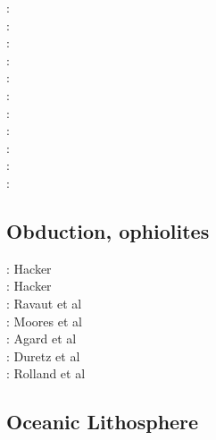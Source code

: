 \begin{scriptsize}
\nineteeneightyfour: \cite{olyb84}\\
\nineteenninety: \cite{ketu90}\\
\nineteenninetysix: \cite{pelt96}\\
\nineteenninetynine: \cite{cori99}\\
\twothousandone: \cite{huke01}\\
\twothousandtwo: \cite{vahb02}\\
\twothousandthree: \cite{fasa03}\cite{vabh03}\\
\twothousandfive: \cite{colt05}\\
\twothousandseven: \cite{gogc07}\cite{nake07}\cite{vabh07}\\
\twothousandeleven: \cite{lemj11}\cite{saad11}\\
\twothousandeighteen: \cite{onzh18}
\end{scriptsize}

\subsection{Obduction, ophiolites}
 

\begin{scriptsize}
\nineteenninety: Hacker \cite{hack90}\\
\nineteenninetyone: Hacker \cite{hack91}\\
\nineteenninetyseven: Ravaut et al \cite{rabh97}\\
\twothousand: Moores et al \cite{mokd00}\\
\twothousandfourteen: Agard et al \cite{agzf14}\\
\twothousandsixteen: Duretz et al \cite{duay16}\\
\twothousandtwenty: Rolland et al \cite{rohb20}
\end{scriptsize}

\subsection{Oceanic Lithosphere}

